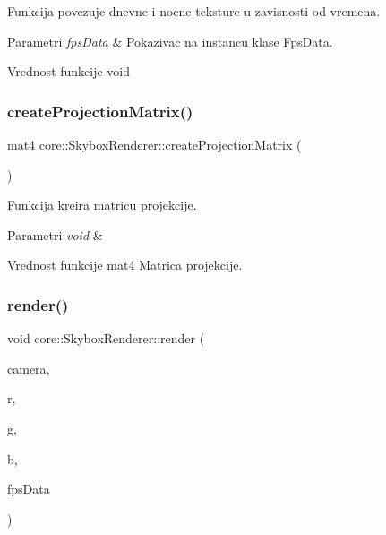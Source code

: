 Funkcija povezuje dnevne i nocne teksture u zavisnosti od vremena. 


\begin{DoxyParams}{Parametri}
{\em fps\+Data} & Pokazivac na instancu klase Fps\+Data. \\
\hline
\end{DoxyParams}
\begin{DoxyReturn}{Vrednost funkcije}
void 
\end{DoxyReturn}
\mbox{\label{classcore_1_1SkyboxRenderer_a27b7410b8520160da370a2707ac29b7e}} 
\subsubsection{\texorpdfstring{create\+Projection\+Matrix()}{createProjectionMatrix()}}
{\footnotesize\ttfamily mat4 core\+::\+Skybox\+Renderer\+::create\+Projection\+Matrix (\begin{DoxyParamCaption}{ }\end{DoxyParamCaption})\hspace{0.3cm}{\ttfamily [private]}}



Funkcija kreira matricu projekcije. 


\begin{DoxyParams}{Parametri}
{\em void} & \\
\hline
\end{DoxyParams}
\begin{DoxyReturn}{Vrednost funkcije}
mat4 Matrica projekcije. 
\end{DoxyReturn}
\mbox{\label{classcore_1_1SkyboxRenderer_a6ab6906aa0c5ff7931088a0ddd52e4c6}} 
\subsubsection{\texorpdfstring{render()}{render()}}
{\footnotesize\ttfamily void core\+::\+Skybox\+Renderer\+::render (\begin{DoxyParamCaption}\item[{\hyperlink{classentity_1_1Camera}{Camera} $\ast$}]{camera,  }\item[{float}]{r,  }\item[{float}]{g,  }\item[{float}]{b,  }\item[{\hyperlink{classutility_1_1FpsData}{Fps\+Data} $\ast$}]{fps\+Data }\end{DoxyParamCaption})}



